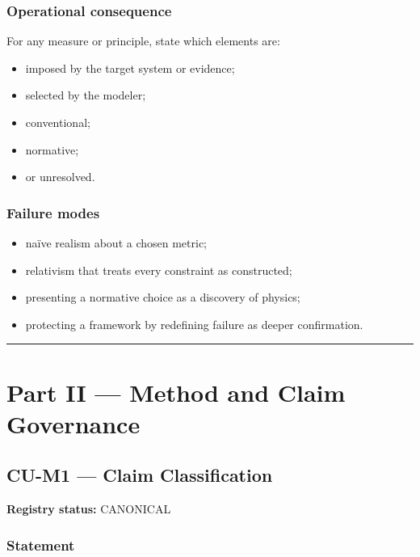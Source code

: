 \documentclass[
  11pt,
]{article}
\providecommand{\tightlist}{%
  \setlength{\itemsep}{0pt}\setlength{\parskip}{0pt}}
\begin{document}
\subsubsection{Operational consequence}\label{operational-consequence-8}

For any measure or principle, state which elements are:

\begin{itemize}
\tightlist
\item
  imposed by the target system or evidence;
\item
  selected by the modeler;
\item
  conventional;
\item
  normative;
\item
  or unresolved.
\end{itemize}

\subsubsection{Failure modes}\label{failure-modes-8}

\begin{itemize}
\tightlist
\item
  naïve realism about a chosen metric;
\item
  relativism that treats every constraint as constructed;
\item
  presenting a normative choice as a discovery of physics;
\item
  protecting a framework by redefining failure as deeper confirmation.
\end{itemize}

\begin{center}\rule{0.5\linewidth}{0.5pt}\end{center}

\section{Part II --- Method and Claim
Governance}\label{part-ii-method-and-claim-governance}

\subsection{CU-M1 --- Claim
Classification}\label{cu-m1-claim-classification}

\textbf{Registry status:} CANONICAL

\subsubsection{Statement}\label{statement-9}
\end{document}

